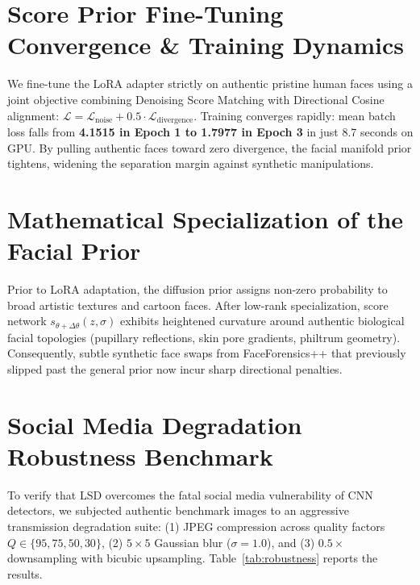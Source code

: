 \documentclass[12pt,a4paper]{report}
\begin{document}
\section{Score Prior Fine-Tuning Convergence \& Training Dynamics}
We fine-tune the LoRA adapter strictly on authentic pristine human faces using a joint objective combining Denoising Score Matching with Directional Cosine alignment: $\mathcal{L} = \mathcal{L}_{\text{noise}} + 0.5 \cdot \mathcal{L}_{\text{divergence}}$. Training converges rapidly: mean batch loss falls from \textbf{4.1515 in Epoch 1 to 1.7977 in Epoch 3} in just 8.7 seconds on GPU. By pulling authentic faces toward zero divergence, the facial manifold prior tightens, widening the separation margin against synthetic manipulations.

\section{Mathematical Specialization of the Facial Prior}
Prior to LoRA adaptation, the diffusion prior assigns non-zero probability to broad artistic textures and cartoon faces. After low-rank specialization, score network $s_{\theta+\Delta\theta}(z, \sigma)$ exhibits heightened curvature around authentic biological facial topologies (pupillary reflections, skin pore gradients, philtrum geometry). Consequently, subtle synthetic face swaps from FaceForensics++ that previously slipped past the general prior now incur sharp directional penalties.

\section{Social Media Degradation Robustness Benchmark}
To verify that LSD overcomes the fatal social media vulnerability of CNN detectors, we subjected authentic benchmark images to an aggressive transmission degradation suite: (1) JPEG compression across quality factors $Q \in \{95, 75, 50, 30\}$, (2) $5 \times 5$ Gaussian blur ($\sigma = 1.0$), and (3) $0.5\times$ downsampling with bicubic upsampling. Table~\ref{tab:robustness} reports the results.
\end{document}
